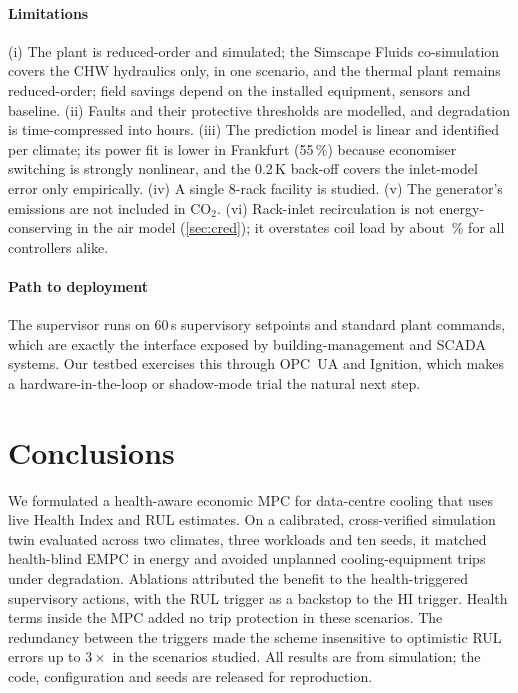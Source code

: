 \documentclass[preprint,12pt,authoryear]{elsarticle}
\begin{document}
\paragraph{Limitations} (i) The plant is reduced-order and simulated; the Simscape Fluids co-simulation covers the CHW hydraulics only, in one scenario, and the thermal plant remains reduced-order; field savings depend on the installed equipment, sensors and baseline. (ii) Faults and their protective thresholds are modelled, and degradation is time-compressed into hours. (iii) The prediction model is linear and identified per climate; its power fit is lower in Frankfurt (55\,\%) because economiser switching is strongly nonlinear, and the 0.2\,K back-off covers the inlet-model error only empirically. (iv) A single 8-rack facility is studied. (v) The generator's emissions are not included in CO$_2$. (vi) Rack-inlet recirculation is not energy-conserving in the air model (\cref{sec:cred}); it overstates coil load by about \CredRecircPct\,\% for all controllers alike.
\paragraph{Path to deployment} The supervisor runs on 60\,s supervisory setpoints and standard plant commands, which are exactly the interface exposed by building-management and SCADA systems. Our testbed exercises this through OPC~UA and Ignition, which makes a hardware-in-the-loop or shadow-mode trial the natural next step.

\section{Conclusions}\label{sec:conclusion}
We formulated a health-aware economic MPC for data-centre cooling that uses live Health Index and RUL estimates. On a calibrated, cross-verified simulation twin evaluated across two climates, three workloads and ten seeds, it matched health-blind EMPC in energy and avoided unplanned cooling-equipment trips under degradation. Ablations attributed the benefit to the health-triggered supervisory actions, with the RUL trigger as a backstop to the HI trigger. Health terms inside the MPC added no trip protection in these scenarios. The redundancy between the triggers made the scheme insensitive to optimistic RUL errors up to $3\times$ in the scenarios studied. All results are from simulation; the code, configuration and seeds are released for reproduction.
\end{document}
